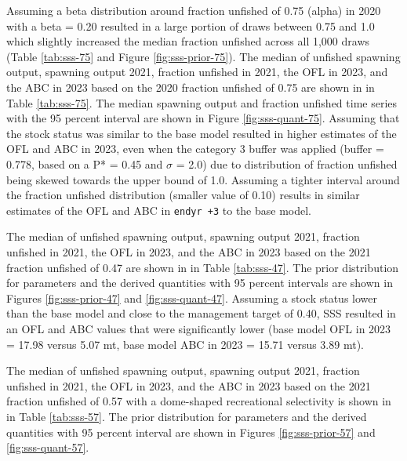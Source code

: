 \documentclass[11pt,
  english,
  a4paper,
]{article}
\begin{document}
Assuming a beta distribution around fraction unfished of 0.75 (alpha) in 2020 with a beta = 0.20 resulted in a large portion of draws between 0.75 and 1.0 which slightly increased the median fraction unfished across all 1,000 draws (Table \ref{tab:sss-75} and Figure \ref{fig:sss-prior-75}). The median of unfished spawning output, spawning output 2021, fraction unfished in 2021, the OFL in 2023, and the ABC in 2023 based on the 2020 fraction unfished of 0.75 are shown in in Table \ref{tab:sss-75}. The median spawning output and fraction unfished time series with the 95 percent interval are shown in Figure \ref{fig:sss-quant-75}. Assuming that the stock status was similar to the base model resulted in higher estimates of the OFL and ABC in 2023, even when the category 3 buffer was applied (buffer = 0.778, based on a P* = 0.45 and {\(\sigma\)\leavevmode\tagmcend\tagstructend} = 2.0) due to distribution of fraction unfished being skewed towards the upper bound of 1.0. Assuming a tighter interval around the fraction unfished distribution (smaller \beta value of 0.10) results in similar estimates of the OFL and ABC in \texttt{endyr\ +3} to the base model.

\leavevmode\tagmcend\tagstructend\par


The median of unfished spawning output, spawning output 2021, fraction unfished in 2021, the OFL in 2023, and the ABC in 2023 based on the 2021 fraction unfished of 0.47 are shown in in Table \ref{tab:sss-47}. The prior distribution for parameters and the derived quantities with 95 percent intervals are shown in Figures \ref{fig:sss-prior-47} and \ref{fig:sss-quant-47}. Assuming a stock status lower than the base model and close to the management target of 0.40, SSS resulted in an OFL and ABC values that were significantly lower (base model OFL in 2023 = 17.98 versus 5.07 mt, base model ABC in 2023 = 15.71 versus 3.89 mt).

\leavevmode\tagmcend\tagstructend\par


The median of unfished spawning output, spawning output 2021, fraction unfished in 2021, the OFL in 2023, and the ABC in 2023 based on the 2021 fraction unfished of 0.57 with a dome-shaped recreational selectivity is shown in in Table \ref{tab:sss-57}. The prior distribution for parameters and the derived quantities with 95 percent interval are shown in Figures \ref{fig:sss-prior-57} and \ref{fig:sss-quant-57}.
\end{document}
